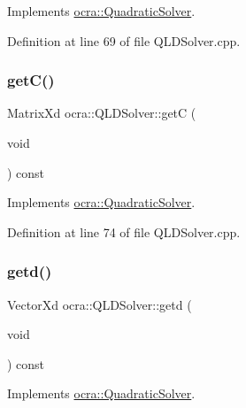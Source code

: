 Implements \hyperlink{classocra_1_1QuadraticSolver_af5cc64ada014e8caf3d2c994eaa1c48a}{ocra\+::\+Quadratic\+Solver}.



Definition at line 69 of file Q\+L\+D\+Solver.\+cpp.

\hypertarget{classocra_1_1QLDSolver_a92a18dc5df3511bcc9fc9ff5f45f621b}{}\label{classocra_1_1QLDSolver_a92a18dc5df3511bcc9fc9ff5f45f621b} 
\subsubsection{\texorpdfstring{get\+C()}{getC()}}
{\footnotesize\ttfamily Matrix\+Xd ocra\+::\+Q\+L\+D\+Solver\+::getC (\begin{DoxyParamCaption}\item[{void}]{ }\end{DoxyParamCaption}) const\hspace{0.3cm}{\ttfamily [virtual]}}



Implements \hyperlink{classocra_1_1QuadraticSolver_a0babcde3ffe8770131b5f842da01c49c}{ocra\+::\+Quadratic\+Solver}.



Definition at line 74 of file Q\+L\+D\+Solver.\+cpp.

\hypertarget{classocra_1_1QLDSolver_ad3434ad289da51ffe440b7959972ca89}{}\label{classocra_1_1QLDSolver_ad3434ad289da51ffe440b7959972ca89} 
\subsubsection{\texorpdfstring{getd()}{getd()}}
{\footnotesize\ttfamily Vector\+Xd ocra\+::\+Q\+L\+D\+Solver\+::getd (\begin{DoxyParamCaption}\item[{void}]{ }\end{DoxyParamCaption}) const\hspace{0.3cm}{\ttfamily [virtual]}}



Implements \hyperlink{classocra_1_1QuadraticSolver_a7f15d5d3c28feac3204542c885d68586}{ocra\+::\+Quadratic\+Solver}.



